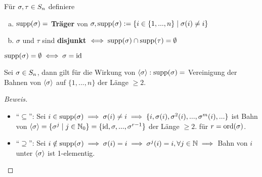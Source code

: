 \documentclass[a4paper]{report}
\begin{document}
\begin{defi}
  Für $\sigma, \tau \in S_n$ definiere
  \begin{enumerate}[(a)]
    \item $\operatorname{supp}(\sigma) =$ \textbf{Träger} von $\sigma, \operatorname{supp}(\sigma) := \{i \in \{1, ..., n\} \mid \sigma(i) \ne i\}$
    \item $\sigma$ und $\tau$ sind \textbf{disjunkt} $\iff \operatorname{supp}(\sigma) \cap \operatorname{supp}(\tau) = \emptyset$
  \end{enumerate}
\end{defi}

\begin{bem*}
$\operatorname{supp}(\sigma) = \emptyset \iff \sigma = \operatorname{id}$
\end{bem*}

\begin{lemm}
  Sei $\sigma \in S_n$, dann gilt für die Wirkung von $\langle \sigma \rangle : \operatorname{supp}(\sigma) =$ Vereinigung der Bahnen von $\langle \sigma \rangle$ auf $\{1, ..., n\}$ der Länge $\ge 2$.
\end{lemm}
\begin{proof}[Beweis] \item
\begin{itemize}
\item ``$\subseteq$'': Sei $i \in \operatorname{supp}(\sigma) \implies \sigma(i) \ne i \implies \{i, \sigma(i), \sigma^{2}(i), ..., \sigma^{m}(i), ...\}$ ist Bahn von $\langle\sigma\rangle = \{\sigma^{j} \mid j \in \mathbb{N}_0\} = \{\operatorname{id}, \sigma, ..., \sigma^{r-1}\}$ der Länge $\ge 2$. für $r = \operatorname{ord}(\sigma)$.
\item ``$\supseteq$'': Sei $i \notin \operatorname{supp}(\sigma) \implies \sigma(i) = i \implies \sigma^{j}(i) = i, \forall j \in \mathbb{N} \implies$ Bahn von $i$ unter $\langle\sigma\rangle$ ist 1-elementig.
\end{itemize}
\end{proof}
\end{document}

